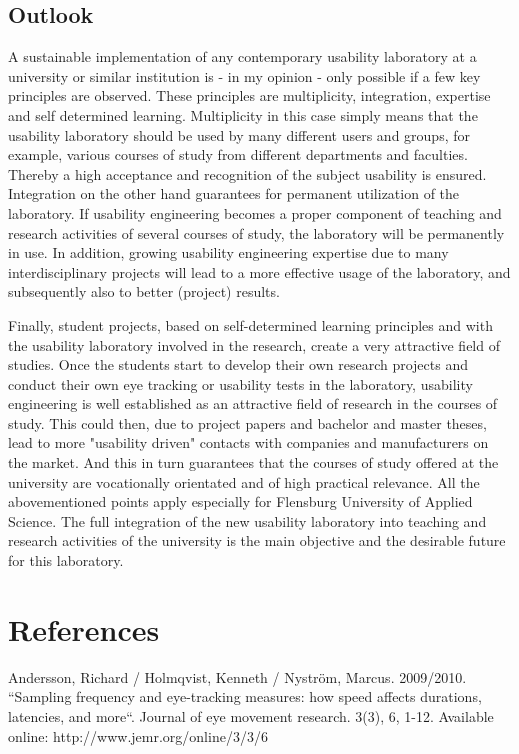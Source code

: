 \documentclass[output=paper]{langsci/langscibook}
\begin{document}
\subsection{Outlook }

A sustainable implementation of any contemporary usability laboratory at a university or similar institution is - in my opinion - only possible if a few key principles are observed. These principles are multiplicity, integration, expertise and self determined learning. Multiplicity in this case simply means that the usability laboratory should be used by many different users and groups, for example, various courses of study from different departments and faculties. Thereby a high acceptance and recognition of the subject usability is ensured. Integration on the other hand guarantees for permanent utilization of the laboratory. If usability engineering becomes a proper component of teaching and research activities of several courses of study, the laboratory will be permanently in use. In addition, growing usability engineering expertise due to many interdisciplinary projects will lead to a more effective usage of the laboratory, and subsequently also to better (project) results.


Finally, student projects, based on self-determined learning principles and with the usability laboratory involved in the research, create a very attractive field of studies. Once the students start to develop their own research projects and conduct their own eye tracking or usability tests in the laboratory, usability engineering is well established as an attractive field of research in the courses of study. This could then, due to project papers and bachelor and master theses, lead to more "usability driven" contacts with companies and manufacturers on the market. And this in turn guarantees that the courses of study offered at the university are vocationally orientated and of high practical relevance. All the abovementioned points apply especially for Flensburg University of Applied Science. The full integration of the new usability laboratory into teaching and research activities of the university is the main objective and the desirable future for this laboratory.


\section{References}


Andersson, Richard / Holmqvist, Kenneth / Nyström, Marcus. 2009/2010. “Sampling frequency and eye-tracking measures: how speed affects durations, latencies, and more“. Journal of eye movement research. 3(3), 6, 1-12. Available online: http://www.jemr.org/online/3/3/6
\end{document}
